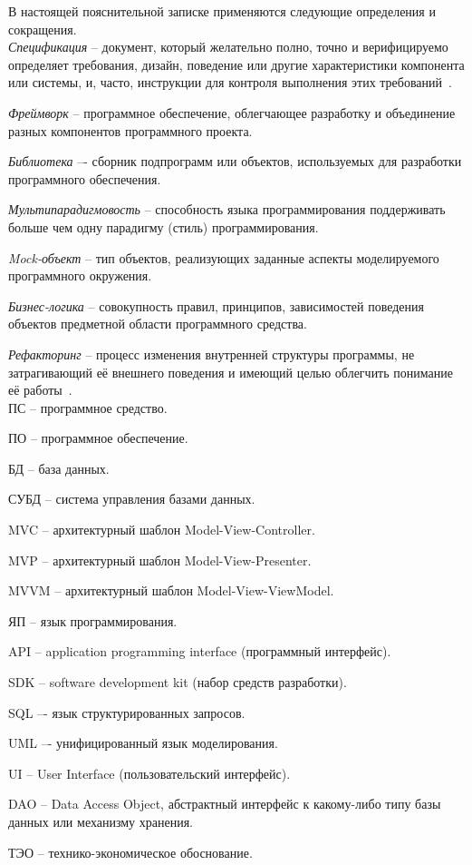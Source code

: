\label{sec:definitions}

В настоящей пояснительной записке применяются следующие определения и сокращения.
\\

\emph{Спецификация} -- документ, который желательно полно, точно и верифицируемо определяет требования, дизайн, поведение или другие характеристики компонента или системы, и, часто, инструкции для контроля выполнения этих требований~\cite{istqb_specification}.

\emph{Фреймворк} -- программное обеспечение, облегчающее разработку и объединение разных компонентов программного проекта.

\emph{Библиотека} –- сборник подпрограмм или объектов, используемых для разработки программного обеспечения.

\emph{Мультипарадигмовость} -- способность языка программирования поддерживать больше чем одну парадигму (стиль) программирования.

\emph{Mock-объект} -- тип объектов, реализующих заданные аспекты моделируемого программного окружения.

\emph{Бизнес-логика} -- совокупность правил, принципов, зависимостей поведения объектов предметной области программного средства.

\emph{Рефакторинг} -- процесс изменения внутренней структуры программы, не затрагивающий её внешнего поведения и имеющий целью облегчить понимание её работы~\cite{frauler_refactoring}.
\\

ПС -- программное средство.

ПО -- программное обеспечение.

БД -- база данных.

СУБД -- система управления базами данных.

MVC -- архитектурный шаблон Model-View-Controller.

MVP -- архитектурный шаблон Model-View-Presenter.

MVVM -- архитектурный шаблон Model-View-ViewModel.

ЯП -- язык программирования.

API -- application programming interface (программный интерфейс).

SDK -- software development kit (набор средств разработки).

SQL –- язык структурированных запросов.

UML –- унифицированный язык моделирования.

UI -- User Interface (пользовательский интерфейс).

DAO -- Data Access Object, абстрактный интерфейс к какому-либо типу базы данных или механизму хранения.

ТЭО -- технико-экономическое обоснование.
